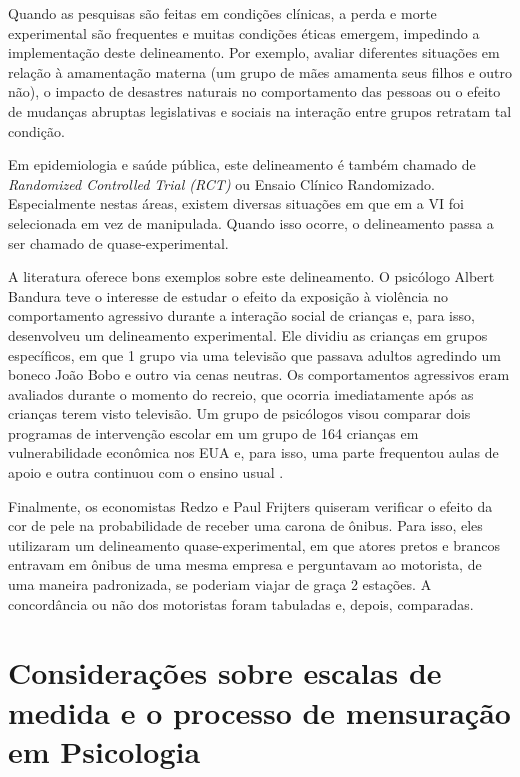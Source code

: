 \documentclass[
]{book}
\begin{document}
Quando as pesquisas são feitas em condições clínicas, a perda e morte experimental são frequentes e muitas condições éticas emergem, impedindo a implementação deste delineamento. Por exemplo, avaliar diferentes situações em relação à amamentação materna (um grupo de mães amamenta seus filhos e outro não), o impacto de desastres naturais no comportamento das pessoas ou o efeito de mudanças abruptas legislativas e sociais na interação entre grupos retratam tal condição.

Em epidemiologia e saúde pública, este delineamento é também chamado de \emph{Randomized Controlled Trial (RCT)} ou Ensaio Clínico Randomizado. Especialmente nestas áreas, existem diversas situações em que em a VI foi selecionada em vez de manipulada. Quando isso ocorre, o delineamento passa a ser chamado de quase-experimental.

A literatura oferece bons exemplos sobre este delineamento. O psicólogo Albert Bandura \citeyearpar{Bandura1961} teve o interesse de estudar o efeito da exposição à violência no comportamento agressivo durante a interação social de crianças e, para isso, desenvolveu um delineamento experimental. Ele dividiu as crianças em grupos específicos, em que 1 grupo via uma televisão que passava adultos agredindo um boneco João Bobo e outro via cenas neutras. Os comportamentos agressivos eram avaliados durante o momento do recreio, que ocorria imediatamente após as crianças terem visto televisão. Um grupo de psicólogos visou comparar dois programas de intervenção escolar em um grupo de 164 crianças em vulnerabilidade econômica nos EUA e, para isso, uma parte frequentou aulas de apoio e outra continuou com o ensino usual \citep{Feil2020}.

Finalmente, os economistas Redzo e Paul Frijters \citeyearpar{Mujcic2020} quiseram verificar o efeito da cor de pele na probabilidade de receber uma carona de ônibus. Para isso, eles utilizaram um delineamento quase-experimental, em que atores pretos e brancos entravam em ônibus de uma mesma empresa e perguntavam ao motorista, de uma maneira padronizada, se poderiam viajar de graça 2 estações. A concordância ou não dos motoristas foram tabuladas e, depois, comparadas.

\hypertarget{considerauxe7uxf5es-sobre-escalas-de-medida-e-o-processo-de-mensurauxe7uxe3o-em-psicologia}{%
\section{Considerações sobre escalas de medida e o processo de mensuração em Psicologia}\label{considerauxe7uxf5es-sobre-escalas-de-medida-e-o-processo-de-mensurauxe7uxe3o-em-psicologia}}
\end{document}
